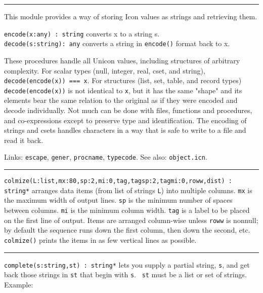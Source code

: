 \vspace{0.25cm}\hrule{}

This module provides a way of storing Icon values as strings and
retrieving them.

\texttt{encode(x:any) : string} converts x to a string s.\\
\texttt{decode(s:string): any} converts a string in \texttt{encode()}
format back to x.

These procedures handle all Unicon values, including structures of
arbitrary complexity. For scalar types (null,
integer, real, cset, and string), \texttt{decode(encode(x)) === x}.
For structures (list, set, table, and record types)
\texttt{decode(encode(x))} is not identical to \texttt{x}, but it has
the same "shape" and its elements bear the
same relation to the original as if they were encoded and decode
individually. Not much can be done with files, functions and
procedures, and co-expressions except to preserve type and
identification. The encoding of strings and csets handles
characters in a way that is safe to write to a file and read it back.

Links: \texttt{escape}, \texttt{gener}, \texttt{procname},
\texttt{typecode}. See also: \texttt{object.icn}. 

\vspace{0.25cm}\hrule{}

\texttt{colmize(L:list,mx:80,sp:2,mi:0,tag,tagsp:2,tagmi:0,roww,dist) :
string*} arranges data items (from list of strings
\texttt{L}) into multiple columns. \texttt{mx} is the maximum width of
output lines. \texttt{sp} is the minimum number of spaces between
columns. \texttt{mi} is the minimum column width. \texttt{tag} is a
label to be placed on the first line of output. Items are arranged
column-wise unless \texttt{roww} is nonnull; by default the sequence runs
down the first column, then down the second, etc. \texttt{colmize()}
prints the items in as few vertical lines as possible.

\vspace{0.25cm}\hrule{}

\texttt{complete(s:string,st) : string*} lets you
supply a partial string, \texttt{s}, and get back those strings in
\texttt{st} that begin with \texttt{s}. \ \texttt{st} must be a list or
set of strings. Example:


